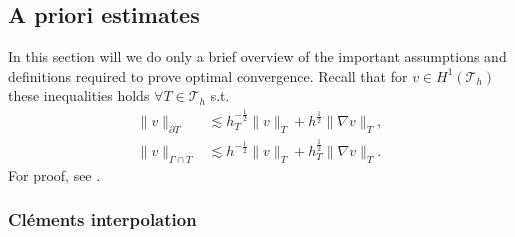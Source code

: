 
\newpage
\subsection{A priori estimates}%
\label{sec:a_priori_estimates}

In this section will we do only a brief overview of the important assumptions and definitions required to prove optimal convergence.
Recall that for $v \in H^{1}( \mathcal{T } _{h}) $ these inequalities holds $\forall T \in \mathcal{T} _{h}$ s.t. \[
\begin{split}
    \| v \|_{ \partial T }^{  } &\lesssim h^{-\frac{1}{2}}_{T}\|  v \|_{ T }^{  }+ h^{\frac{1}{2}} \| \nabla v \|_{T  }^{   }  , \\
    \| v \|_{ \Gamma \cap T }^{  } &\lesssim  h^{-\frac{1}{2}} \| v \|_{T  }^{  }   + h^{\frac{1}{2}}_{T} \| \nabla v \|_{ T }^{  }.
\end{split}
\]
For proof, see \cite[Lemma 4.2]{hansbo2003finite}.

\subsubsection{Cléments interpolation}%
\label{ssub:clement_operator}

